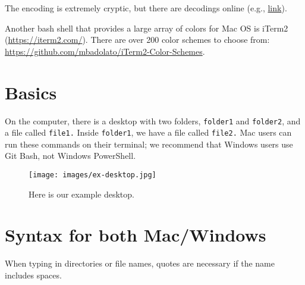 \documentclass[
]{book}
\begin{document}
The encoding is extremely cryptic, but there are decodings online (e.g., \href{http://www.marinamele.com/2014/05/customize-colors-of-your-terminal-in-mac-os-x.html}{link}).

Another bash shell that provides a large array of colors for Mac OS is iTerm2 (\url{https://iterm2.com/}). There are over 200 color schemes to choose from: \url{https://github.com/mbadolato/iTerm2-Color-Schemes}.

\hypertarget{basics-2}{%
\section{Basics}\label{basics-2}}

On the computer, there is a desktop with two folders, \texttt{folder1} and \texttt{folder2}, and a file called \texttt{file1.} Inside \texttt{folder1}, we have a file called \texttt{file2.} Mac users can run these commands on their terminal; we recommend that Windows users use Git Bash, not Windows PowerShell.

\begin{figure}
\centering
\texttt{[image: images/ex-desktop.jpg]}
\caption{Here is our example desktop.}
\end{figure}

\hypertarget{syntax-for-both-macwindows}{%
\section{Syntax for both Mac/Windows}\label{syntax-for-both-macwindows}}

When typing in directories or file names, quotes are necessary if the name includes spaces.
\end{document}

